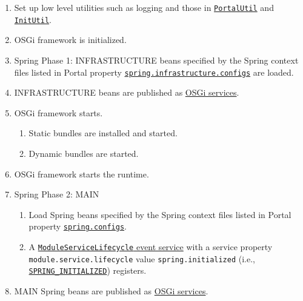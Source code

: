 \begin{enumerate}
\def\labelenumi{\arabic{enumi}.}
\item
  Set up low level utilities such as logging and those in
  \href{https://docs.liferay.com/dxp/portal/7.2-latest/javadocs/portal-kernel/com/liferay/portal/kernel/util/PortalUtil.html}{\texttt{PortalUtil}}
  and
  \href{https://docs.liferay.com/dxp/portal/7.2-latest/javadocs/portal-impl/com/liferay/portal/util/InitUtil.html}{\texttt{InitUtil}}.
\item
  OSGi framework is initialized.
\item
  Spring Phase 1: INFRASTRUCTURE beans specified by the Spring context
  files listed in Portal property
  \href{https://docs.liferay.com/dxp/portal/7.2-latest/propertiesdoc/portal.properties.html\#Spring}{\texttt{spring.infrastructure.configs}}
  are loaded.
\item
  INFRASTRUCTURE beans are published as
  \href{/docs/7-2/frameworks/-/knowledge_base/f/declarative-services}{OSGi
  services}.
\item
  OSGi framework starts.

  \begin{enumerate}
  \def\labelenumii{\arabic{enumii}.}
  \tightlist
  \item
    Static bundles are installed and started.
  \item
    Dynamic bundles are started.
  \end{enumerate}
\item
  OSGi framework starts the runtime.
\item
  Spring Phase 2: MAIN

  \begin{enumerate}
  \def\labelenumii{\arabic{enumii}.}
  \tightlist
  \item
    Load Spring beans specified by the Spring context files listed in
    Portal property
    \href{https://docs.liferay.com/dxp/portal/7.2-latest/propertiesdoc/portal.properties.html\#Spring}{\texttt{spring.configs}}.
  \item
    A
    \hyperref[moduleservicelifecycle-events]{\texttt{ModuleServiceLifecycle}
    event service} with a service property
    \texttt{module.service.lifecycle} value \texttt{spring.initialized}
    (i.e.,
    \href{https://docs.liferay.com/dxp/portal/7.2-latest/javadocs/portal-kernel/constant-values.html\#com.liferay.portal.kernel.module.framework.ModuleServiceLifecycle.SPRING_INITIALIZED}{\texttt{SPRING\_INITIALIZED}})
    registers.
  \end{enumerate}
\item
  MAIN Spring beans are published as
  \href{/docs/7-2/frameworks/-/knowledge_base/f/declarative-services}{OSGi
  services}.
\end{enumerate}

